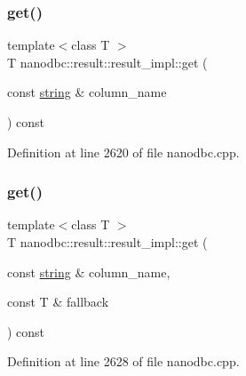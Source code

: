 \subsubsection{\texorpdfstring{get()}{get()}\hspace{0.1cm}{\footnotesize\ttfamily [3/4]}}
{\footnotesize\ttfamily template$<$class T $>$ \\
T nanodbc\+::result\+::result\+\_\+impl\+::get (\begin{DoxyParamCaption}\item[{const \mbox{\hyperlink{namespacenanodbc_abfc0ece56278e590911ec8352774c212}{string}} \&}]{column\+\_\+name }\end{DoxyParamCaption}) const\hspace{0.3cm}{\ttfamily [inline]}}



Definition at line 2620 of file nanodbc.\+cpp.

\mbox{\label{classnanodbc_1_1result_1_1result__impl_a5ae17f6c7746a30b8b35868e52b273e1}} 
\subsubsection{\texorpdfstring{get()}{get()}\hspace{0.1cm}{\footnotesize\ttfamily [4/4]}}
{\footnotesize\ttfamily template$<$class T $>$ \\
T nanodbc\+::result\+::result\+\_\+impl\+::get (\begin{DoxyParamCaption}\item[{const \mbox{\hyperlink{namespacenanodbc_abfc0ece56278e590911ec8352774c212}{string}} \&}]{column\+\_\+name,  }\item[{const T \&}]{fallback }\end{DoxyParamCaption}) const\hspace{0.3cm}{\ttfamily [inline]}}



Definition at line 2628 of file nanodbc.\+cpp.

\mbox{\label{classnanodbc_1_1result_1_1result__impl_adabb4d9ae0421f0a5e7b92820b785efb}} 
